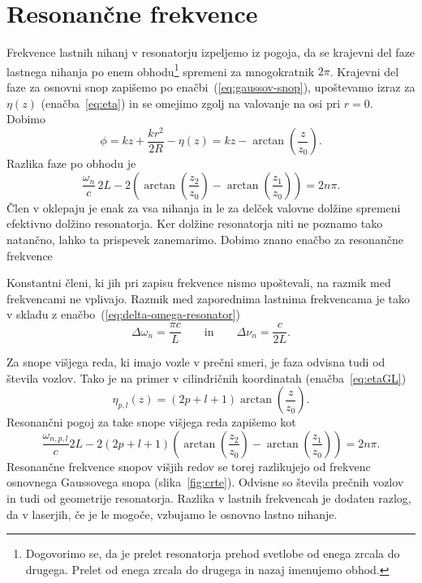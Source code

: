 \section{Resonančne frekvence}
Frekvence
lastnih nihanj v resonatorju izpeljemo iz pogoja, 
da se krajevni del faze lastnega nihanja po enem 
obhodu\footnote{Dogovorimo se, da je prelet resonatorja prehod svetlobe od enega zrcala
do drugega. Prelet od enega zrcala do drugega in nazaj imenujemo obhod.}
spremeni za mnogokratnik $2\pi$. Krajevni del faze za osnovni snop 
zapišemo po enačbi~(\ref{eq:gaussov-snop}), upoštevamo izraz za
$\eta(z)$ (enačba~\ref{eq:eta}) in se omejimo zgolj na valovanje na osi pri $r=0$.
Dobimo
\begin{equation}
\phi = kz+\frac{kr^{2}}{2R} -\eta(z) = kz-\arctan \left(\frac{z}{z_{0}}\right)\!\!.
\label{eq:fazag}
\end{equation}
Razlika faze po obhodu je 
\begin{equation}
\frac{\omega_{n}}{c}\,2L-2\left(\arctan \left(\frac{z_{2}}{z_{0}}\right)-
\arctan\left(\frac{z_{1}}{z_{0}}\right)\right)=2n\pi.
\label{eq:fazan}
\end{equation}
Člen v oklepaju je enak za vsa nihanja in le za delček valovne dolžine 
spremeni efektivno dolžino resonatorja. Ker dolžine resonatorja niti ne poznamo
tako natančno, lahko ta prispevek zanemarimo. Dobimo znano enačbo za resonančne frekvence 

Konstantni členi, ki jih pri zapisu frekvence nismo upoštevali, na razmik med
frekvencami ne vplivajo. Razmik med zaporednima
lastnima frekvencama je tako v skladu z enačbo~(\ref{eq:delta-omega-resonator})
\begin{equation}
\Delta\omega_n=\frac{\pi c}{L} \qquad \mathrm{in}\qquad \Delta \nu_n=\frac{c}{2L}.
\label{eq:deltaomega}
\end{equation}

Za snope višjega reda, ki imajo vozle v prečni smeri, je faza
odvisna tudi od števila vozlov. Tako je na primer v cilindričnih koordinatah
(enačba~\ref{eq:etaGL})
\begin{equation}
\eta_{p,l}(z)=(2p+l+1)\arctan\left(\frac{z}{z_{0}}\right)\!\!.
\end{equation}
Resonančni pogoj za take snope višjega reda zapišemo kot
\begin{equation}
\frac{\omega_{n,p,l}}{c}2L-2(2p+l+1)\left(\arctan\left(\frac{z_{2}}{z_{0}}\right)-
\arctan\left(\frac{z_{1}}{z_{0}}\right)\right)=2n\pi.
\end{equation}
Resonančne frekvence snopov višjih redov se torej razlikujejo od frekvenc
osnovnega Gaussovega snopa (slika~\ref{fig:crte}). Odvisne so števila prečnih vozlov
in tudi od geometrije resonatorja. 
Razlika v lastnih frekvencah je dodaten razlog, da v laserjih, če je le mogoče, 
vzbujamo le osnovno lastno nihanje.

